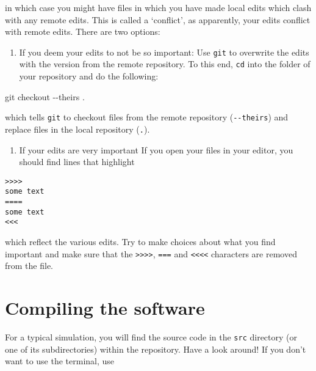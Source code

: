 \documentclass[
]{book}
\newenvironment{Shaded}{\begin{snugshade}}{\end{snugshade}}
\newcommand{\AttributeTok}[1]{\textcolor[rgb]{0.77,0.63,0.00}{#1}}
\newcommand{\FunctionTok}[1]{\textcolor[rgb]{0.00,0.00,0.00}{#1}}
\newcommand{\NormalTok}[1]{#1}
\providecommand{\tightlist}{%
  \setlength{\itemsep}{0pt}\setlength{\parskip}{0pt}}
\begin{document}
in which case you might have files in which you have made local edits which clash
with any remote edits. This is called a `conflict', as apparently, your edits conflict
with remote edits. There are two options:

\begin{enumerate}
\def\labelenumi{\arabic{enumi}.}
\tightlist
\item
  If you deem your edits to not be so important:
  Use \texttt{git} to overwrite the edits with the version from the remote repository.
  To this end, \texttt{cd} into the folder of your repository and do the following:
\end{enumerate}

\begin{Shaded}
\begin{Highlighting}[]
\FunctionTok{git}\NormalTok{ checkout }\AttributeTok{{-}{-}theirs}\NormalTok{ .}
\end{Highlighting}
\end{Shaded}

which tells \texttt{git} to checkout files from the remote repository (\texttt{-\/-theirs}) and
replace files in the local repository (\texttt{.}).

\begin{enumerate}
\def\labelenumi{\arabic{enumi}.}
\setcounter{enumi}{1}
\tightlist
\item
  If your edits are very important
  If you open your files in your editor, you should find lines that highlight
\end{enumerate}

\begin{verbatim}
>>>>
some text
====
some text
<<<
\end{verbatim}

which reflect the various edits. Try to make choices about what you find important
and make sure that the \texttt{\textgreater{}\textgreater{}\textgreater{}\textgreater{}}, \texttt{===} and \texttt{\textless{}\textless{}\textless{}\textless{}} characters are removed from the file.

\hypertarget{compiling-the-software}{%
\section{Compiling the software}\label{compiling-the-software}}

For a typical simulation, you will find the source code in the \texttt{src} directory (or one of its subdirectories) within the repository. Have a look around! If you don't want to use the terminal, use
\end{document}

